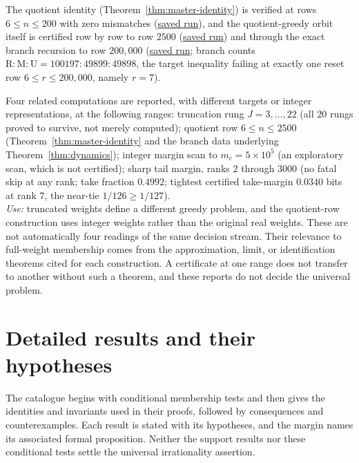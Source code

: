 \begin{obs}
\label{obs:anchors-depth}
The quotient identity (Theorem~\ref{thm:master-identity}) is verified at rows $6 \le n \le 200$ with zero
mismatches
(\href{https://github.com/wcook04/plectis-erdos/blob/f757115e03bebe5c04431a147da559015c680a37/research/experiments/erdos257/receipts/quotient-identity-200.json}{saved run}),
and the quotient-greedy orbit itself is certified row by row to row $2500$
(\href{https://github.com/wcook04/plectis-erdos/blob/f757115e03bebe5c04431a147da559015c680a37/research/experiments/erdos257/receipts/seam-reset-crossing-2500.json}{saved run})
and through the exact branch recursion to row $200{,}000$
(\href{https://github.com/wcook04/plectis-erdos/blob/f757115e03bebe5c04431a147da559015c680a37/research/experiments/erdos257/receipts/seam-orbit-200000.json}{saved run}; branch counts $\mathrm{R{:}M{:}U} =
100197{:}49899{:}49898$, the target inequality failing at exactly one reset row $6\le r\le 200{,}000$,
namely $r=7$).
\end{obs}

\begin{obs}
\label{obs:anchors-coords}
Four related computations are reported, with different targets or
integer representations, at the following ranges: truncation rung $J = 3,\dots,22$ (all $20$ rungs proved to
survive, not merely computed); quotient row $6 \le n \le 2500$
(Theorem~\ref{thm:master-identity} and the branch data underlying
Theorem~\ref{thm:dynamics}); integer margin scan to $m_c = 5\times10^5$
(an exploratory scan, which is not certified); sharp tail margin, ranks $2$ through
$3000$ (no fatal skip at any rank; take fraction $0.4992$; tightest certified take-margin
$0.0340$ bits at rank $7$, the near-tie $1/126 \ge 1/127$).\\
\textit{Use:} truncated weights define a different greedy problem,
and the quotient-row construction uses integer weights rather than the
original real weights.  These are not automatically four readings of
the same decision stream.  Their relevance to full-weight membership
comes from the approximation, limit, or identification theorems cited
for each construction.  A certificate at one range does not transfer
to another without such a theorem, and these reports do not decide the
universal problem.
\end{obs}

\section{Detailed results and their hypotheses}
The catalogue begins with conditional membership tests and then gives
the identities and invariants used in their proofs, followed by
consequences and counterexamples. Each result is stated with its
hypotheses, and the margin names its associated formal proposition.
Neither the support results nor these conditional tests settle the
universal irrationality assertion.

